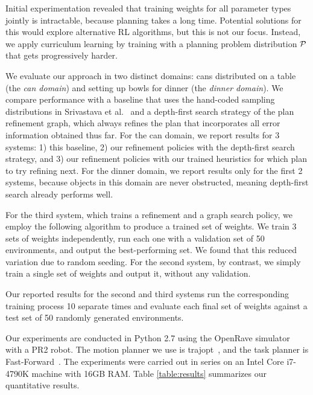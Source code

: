 Initial experimentation revealed that training weights for all parameter types jointly is intractable,
because planning takes a long time. Potential solutions for this would explore alternative RL algorithms,
but this is not our focus. Instead, we apply curriculum learning by training with a planning problem distribution
$\mathcal{P}$ that gets progressively harder.

We evaluate our approach in two distinct domains: cans distributed on a table (the \emph{can domain})
and setting up bowls for dinner (the \emph{dinner domain}).
We compare performance with a baseline that uses the hand-coded sampling distributions
in Srivastava et al.~\cite{srivastava2014combined} and a depth-first search strategy of the
plan refinement graph, which always refines the plan that incorporates all error information obtained
thus far. For the can domain, we report results for 3 systems: 1) this baseline, 2) our refinement policies
with the depth-first search strategy, and 3) our refinement policies with our trained heuristics for which
plan to try refining next. For the dinner domain, we report results only for the first 2 systems, because objects
in this domain are never obstructed, meaning depth-first search already performs well.

For the third system, which trains a refinement and a graph search policy, we employ the following
algorithm to produce a trained set of weights. We train 3 sets of weights independently, run each
one with a validation set of 50 environments, and output the best-performing set. We found that this
reduced variation due to random seeding. For the second system, by contrast, we simply train a single
set of weights and output it, without any validation.

Our reported results for the second and third systems run the corresponding training process 10 separate times
and evaluate each final set of weights against a test set of 50 randomly generated environments.

Our experiments are conducted in Python 2.7 using the OpenRave simulator~\cite{Diankov_2008_6117} with a PR2 robot.
The motion planner we use is trajopt~\cite{schulman2013finding}, and the task planner is Fast-Forward~\cite{FF}.
The experiments were carried out in series on an Intel Core i7-4790K machine with 16GB RAM.
Table \ref{table:results} summarizes our quantitative results.

